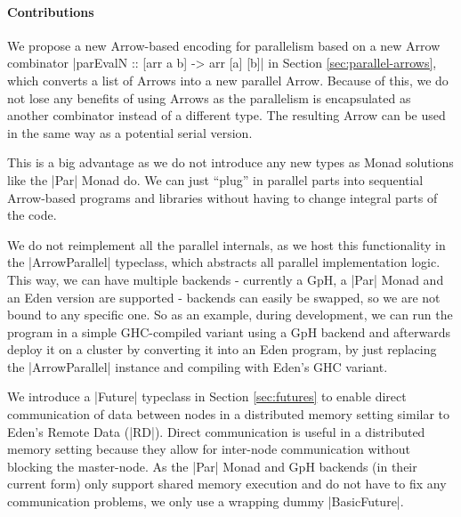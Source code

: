 \paragraph{Contributions}
%
%
We propose a new Arrow-based encoding for parallelism based on a new Arrow combinator |parEvalN :: [arr a b] -> arr [a] [b]| in Section \ref{sec:parallel-arrows}, which converts a list of Arrows into a new parallel Arrow. Because of this, we do not lose any benefits of using Arrows as the parallelism is encapsulated as another combinator instead of a different type. The resulting Arrow can be used in the same way as a potential serial version.

This is a big advantage as we do not introduce any new types as Monad solutions like the |Par| Monad do. We can just \enquote{plug} in parallel parts into sequential Arrow-based programs and libraries without having to change integral parts of the code. 


We do not reimplement all the parallel internals, as we host this functionality in the |ArrowParallel| typeclass, which abstracts all parallel implementation logic. This way, we can have multiple backends - currently a GpH, a |Par| Monad and an Eden version are supported - backends can easily be swapped, so we are not bound to any specific one. So as an example, during development, we can run the program in a simple GHC-compiled variant using a GpH backend and afterwards deploy it on a cluster by converting it into an Eden program, by just replacing the |ArrowParallel| instance and compiling with Eden's GHC variant.

We introduce a |Future| typeclass in Section \ref{sec:futures} to enable direct communication of data between nodes in a distributed memory setting similar to Eden's Remote Data (|RD|). Direct communication is useful in a distributed memory setting because they allow for inter-node communication without blocking the master-node. As the |Par| Monad and GpH backends (in their current form) only support shared memory execution and do not have to fix any communication problems, we only use a wrapping dummy |BasicFuture|.

